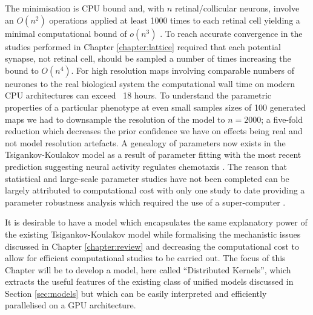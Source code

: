 The minimisation is CPU bound and, with $n$ retinal/collicular neurons, involve an $O(n^2)$ operations applied at least 1000 times to each retinal cell yielding a minimal computational bound of $o(n^3)$ \cite{Triplett2011-jk}. To reach accurate convergence in the studies performed in Chapter \ref{chapter:lattice} required that each potential synapse, not retinal cell, should be sampled a number of times increasing the bound to $O(n^4)$. For high resolution maps involving comparable numbers of neurones to the real biological system the computational wall time on modern CPU architectures can exceed ~18 hours. To understand the parametric properties of a particular phenotype at even small samples sizes of 100 generated maps we had to downsample the resolution of the model to $n=2000$; a five-fold reduction which decreases the prior confidence we have on effects being real and not model resolution artefacts. A genealogy of parameters now exists in the Tsigankov-Koulakov model as a result of parameter fitting with the most recent prediction suggesting neural activity regulates chemotaxis \cite{Koulakov2004-ia, Tsigankov2006-uy, Tsigankov2010-on, Triplett2011-jk, Lyngholm2019-fs}. The reason that statistical and large-scale parameter studies have not been completed can be largely attributed to computational cost with only one study to date providing a parameter robustness analysis which required the use of a super-computer \cite{Tikidji-Hamburyan2016-sn}.

It is desirable to have a model which encapsulates the same explanatory power of the existing Tsigankov-Koulakov model while formalising the mechanistic issues discussed in Chapter \ref{chapter:review} and decreasing the computational cost to allow for efficient computational studies to be carried out. The focus of this Chapter will be to develop a model, here called ``Distributed Kernels'', which extracts the useful features of the existing class of unified models discussed in Section \ref{sec:models} but which can be easily interpreted and efficiently parallelised on a GPU architecture.
  

